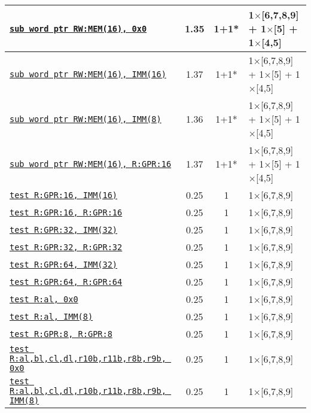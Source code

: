 \documentclass[a4paper,english,fontsize=9]{scrartcl}
\begin{document}
\begin{longtable}{p{}ccL{.25\textwidth}}
  \texttt{\href{https://felixcloutier.com/x86/SUB.html}{sub word ptr RW:MEM(16), 0x0}} & 1.35 & 1+1* & 1\(\times\)[6,7,8,9] + 1\(\times\)[5] + 1\(\times\)[4,5] \\
  \midrule
  \texttt{\href{https://felixcloutier.com/x86/SUB.html}{sub word ptr RW:MEM(16), IMM(16)}} & 1.37 & 1+1* & 1\(\times\)[6,7,8,9] + 1\(\times\)[5] + 1\(\times\)[4,5] \\
  \midrule
  \texttt{\href{https://felixcloutier.com/x86/SUB.html}{sub word ptr RW:MEM(16), IMM(8)}} & 1.36 & 1+1* & 1\(\times\)[6,7,8,9] + 1\(\times\)[5] + 1\(\times\)[4,5] \\
  \midrule
  \texttt{\href{https://felixcloutier.com/x86/SUB.html}{sub word ptr RW:MEM(16), R:GPR:16}} & 1.37 & 1+1* & 1\(\times\)[6,7,8,9] + 1\(\times\)[5] + 1\(\times\)[4,5] \\
  \midrule
  \texttt{\href{https://felixcloutier.com/x86/TEST.html}{test R:GPR:16, IMM(16)}} & 0.25 & 1 & 1\(\times\)[6,7,8,9] \\
  \midrule
  \texttt{\href{https://felixcloutier.com/x86/TEST.html}{test R:GPR:16, R:GPR:16}} & 0.25 & 1 & 1\(\times\)[6,7,8,9] \\
  \midrule
  \texttt{\href{https://felixcloutier.com/x86/TEST.html}{test R:GPR:32, IMM(32)}} & 0.25 & 1 & 1\(\times\)[6,7,8,9] \\
  \midrule
  \texttt{\href{https://felixcloutier.com/x86/TEST.html}{test R:GPR:32, R:GPR:32}} & 0.25 & 1 & 1\(\times\)[6,7,8,9] \\
  \midrule
  \texttt{\href{https://felixcloutier.com/x86/TEST.html}{test R:GPR:64, IMM(32)}} & 0.25 & 1 & 1\(\times\)[6,7,8,9] \\
  \midrule
  \texttt{\href{https://felixcloutier.com/x86/TEST.html}{test R:GPR:64, R:GPR:64}} & 0.25 & 1 & 1\(\times\)[6,7,8,9] \\
  \midrule
  \texttt{\href{https://felixcloutier.com/x86/TEST.html}{test R:al, 0x0}} & 0.25 & 1 & 1\(\times\)[6,7,8,9] \\
  \midrule
  \texttt{\href{https://felixcloutier.com/x86/TEST.html}{test R:al, IMM(8)}} & 0.25 & 1 & 1\(\times\)[6,7,8,9] \\
  \midrule
  \texttt{\href{https://felixcloutier.com/x86/TEST.html}{test R:GPR:8, R:GPR:8}} & 0.25 & 1 & 1\(\times\)[6,7,8,9] \\
  \midrule
  \texttt{\href{https://felixcloutier.com/x86/TEST.html}{test R:al,bl,cl,dl,r10b,r11b,r8b,r9b, 0x0}} & 0.25 & 1 & 1\(\times\)[6,7,8,9] \\
  \midrule
  \texttt{\href{https://felixcloutier.com/x86/TEST.html}{test R:al,bl,cl,dl,r10b,r11b,r8b,r9b, IMM(8)}} & 0.25 & 1 & 1\(\times\)[6,7,8,9] \\

\end{longtable}
\end{document}
